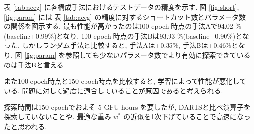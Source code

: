 表 \ref{tab:accg} に各構成手法におけるテストデータの精度を示す.
図 \ref{fig:short}, \ref{fig:param} には
表 \ref{tab:accg} の精度に対するショートカット数とパラメータ数の関係を図示する.
最も性能が高かったのは100 epoch 時点の手法Aで94.02 \%(baseline+0.99\%)となり,
100 epoch 時点の手法Bは93.93 \%(baseline+0.90\%)となった.
しかしランダム手法と比較すると, 手法Aは+0.35\%, 手法Bは+0.46\%となり,
図 \ref{fig:param} を参照しても少ないパラメータ数でより有効に探索できているのは手法Bと言える.

また100 epoch時点と150 epoch時点を比較すると, 学習によって性能が悪化している.
問題に対して過度に適合していることが原因であると考えられる.

探索時間は150 epochでおよそ 5 GPU hours を要したが, DARTSと比べ演算子を探索していないことや.
最適な重み $w^*$ の近似を1次下げていることで高速になったと思われる.
